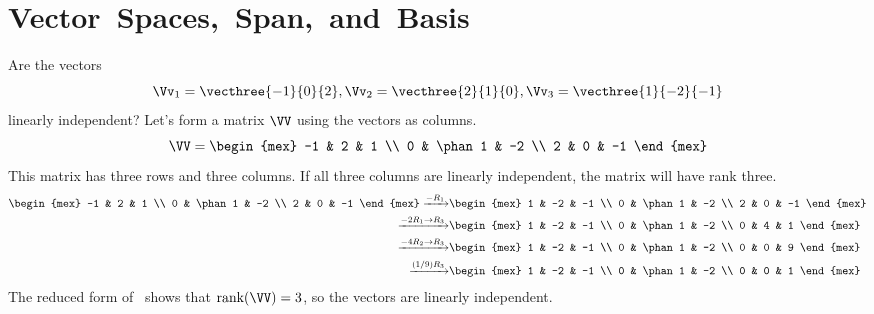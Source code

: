 \documentclass[12pt,ragged]{pajarticle}
\begin{document}

\section*{\hbox{Vector Spaces, Span, and Basis}}

\begin{question}{1}{%
Are the vectors
\[ \Vv_1 = \vecthree{-1}{0}{2}, \Vv_2 = \vecthree{2}{1}{0}, \Vv_3 = \vecthree{1}{-2}{-1} \]
linearly independent?}{
Let's form a matrix $\VV$ using the vectors as columns.
\[ \VV = \begin{mex} -1 & 2 & 1 \\ 0 & \phan1 & -2 \\ 2 & 0 & -1 \end{mex} \]
This matrix has three rows and three columns. If all three columns are linearly independent, the matrix will have rank three.
\begin{align*}
	\begin{mex} -1 & 2 & 1 \\ 0 & \phan1 & -2 \\ 2 & 0 & -1 \end{mex} \xrightarrow{-R_1}&
	\begin{mex} 1 & -2 & -1 \\ 0 & \phan1 & -2 \\ 2 & 0 & -1 \end{mex} \\
	\xrightarrow{-2R_1\rightarrow R_3}&
	\begin{mex} 1 & -2 & -1 \\ 0 & \phan1 & -2 \\ 0 & 4 & 1 \end{mex} \\
	\xrightarrow{-4R_2\rightarrow R_3}&
	\begin{mex} 1 & -2 & -1 \\ 0 & \phan1 & -2 \\ 0 & 0 & 9 \end{mex} \\
	\xrightarrow{(1/9) R_3}&
	\begin{mex} 1 & -2 & -1 \\ 0 & \phan1 & -2 \\ 0 & 0 & 1 \end{mex}
\end{align*}
The reduced form of \VV\ shows that $\text{rank}(\VV)=3$, so the vectors are linearly independent.
}
\end{question}
\end{document}
